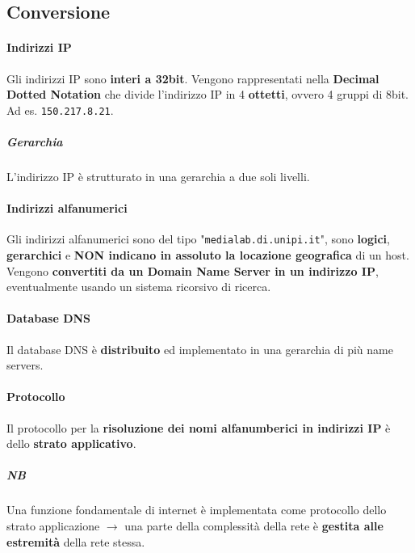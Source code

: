 \documentclass[10pt]{article}
\begin{document}
\subsection{Conversione}
\paragraph{Indirizzi IP} Gli indirizzi IP sono \textbf{interi a 32bit}. Vengono rappresentati nella \textbf{Decimal Dotted Notation} che divide l'indirizzo IP in 4 \textbf{ottetti}, ovvero 4 gruppi di 8bit. Ad es. \texttt{150.217.8.21}.
\subparagraph{Gerarchia} L'indirizzo IP è strutturato in una gerarchia a due soli livelli.
\paragraph{Indirizzi alfanumerici} Gli indirizzi alfanumerici sono del tipo "\texttt{medialab.di.unipi.it}", sono \textbf{logici}, \textbf{gerarchici} e \textbf{NON indicano in assoluto la locazione geografica} di un host.\\
Vengono \textbf{convertiti da un Domain Name Server in un indirizzo IP}, eventualmente usando un sistema ricorsivo di ricerca.
\paragraph{Database DNS} Il database DNS è \textbf{distribuito} ed implementato in una gerarchia di più name servers.
\paragraph{Protocollo} Il protocollo per la \textbf{risoluzione dei nomi alfanumberici in indirizzi IP} è dello \textbf{strato applicativo}.
\subparagraph{NB} Una funzione fondamentale di internet è implementata come protocollo dello strato applicazione $\rightarrow$ una parte della complessità della rete è \textbf{gestita alle estremità} della rete stessa.
\end{document}
